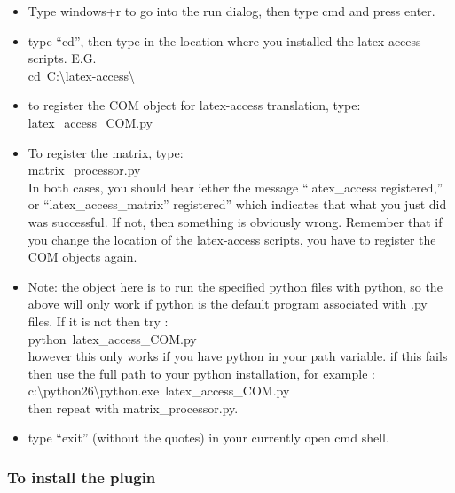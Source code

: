 \documentclass[12pt,a4paper]{report}
\begin{document}
\begin{itemize}
\item Type windows+r to go into the run dialog, then type cmd and press enter.
\item type ``cd'', then type in the location where you installed the latex-access scripts.  E.G.\\
\mbox{cd C:\textbackslash latex-access\textbackslash}
\item to register the COM object for latex-access translation, type:\\
\mbox{latex\_access\_COM.py}
\item To register the matrix, type:\\
\mbox{matrix\_processor.py}\\
  In both cases, you should hear iether the message ``latex\_access
  registered,'' or ``latex\_access\_matrix'' registered'' 
  which indicates that what you just did was successful.  If not,   then something is obviously wrong.  Remember that if you change the location of the latex-access scripts, you have to register the COM objects again.
\item Note: the object here is to run the specified python files with python, so the above will only work if python is the default program associated with .py files.  If it is not then try :\\
\mbox{python latex\_access\_COM.py}\\
however this only works if you have python in your path variable.  if this fails then use the full path to your python installation, for example :\\
\mbox{c:\textbackslash python26\textbackslash python.exe latex\_access\_COM.py}\\
then repeat with matrix\_processor.py.
\item type ``exit'' (without the quotes) in your currently open cmd shell.
\end{itemize}

\subsubsection{To install the plugin}
\end{document}
